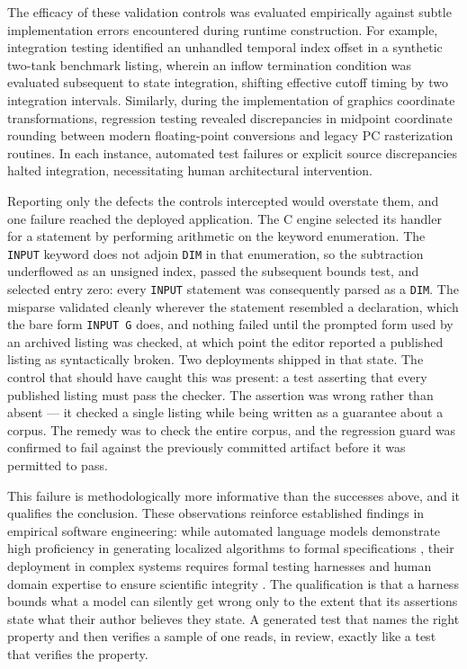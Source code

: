 \documentclass[11pt,a4paper]{article}
\begin{document}
The efficacy of these validation controls was evaluated empirically against subtle implementation errors encountered during runtime construction. For example, integration testing identified an unhandled temporal index offset in a synthetic two-tank benchmark listing, wherein an inflow termination condition was evaluated subsequent to state integration, shifting effective cutoff timing by two integration intervals. Similarly, during the implementation of graphics coordinate transformations, regression testing revealed discrepancies in midpoint coordinate rounding between modern floating-point conversions and legacy PC rasterization routines. In each instance, automated test failures or explicit source discrepancies halted integration, necessitating human architectural intervention.

Reporting only the defects the controls intercepted would overstate them, and one failure reached the deployed application. The C engine selected its handler for a statement by performing arithmetic on the keyword enumeration. The \texttt{INPUT} keyword does not adjoin \texttt{DIM} in that enumeration, so the subtraction underflowed as an unsigned index, passed the subsequent bounds test, and selected entry zero: every \texttt{INPUT} statement was consequently parsed as a \texttt{DIM}. The misparse validated cleanly wherever the statement resembled a declaration, which the bare form \texttt{INPUT G} does, and nothing failed until the prompted form used by an archived listing was checked, at which point the editor reported a published listing as syntactically broken. Two deployments shipped in that state. The control that should have caught this was present: a test asserting that every published listing must pass the checker. The assertion was wrong rather than absent --- it checked a single listing while being written as a guarantee about a corpus. The remedy was to check the entire corpus, and the regression guard was confirmed to fail against the previously committed artifact before it was permitted to pass.

This failure is methodologically more informative than the successes above, and it qualifies the conclusion. These observations reinforce established findings in empirical software engineering: while automated language models demonstrate high proficiency in generating localized algorithms to formal specifications \citep{chen2021}, their deployment in complex systems requires formal testing harnesses and human domain expertise to ensure scientific integrity \citep{jimenez2024}. The qualification is that a harness bounds what a model can silently get wrong only to the extent that its assertions state what their author believes they state. A generated test that names the right property and then verifies a sample of one reads, in review, exactly like a test that verifies the property.
\end{document}
